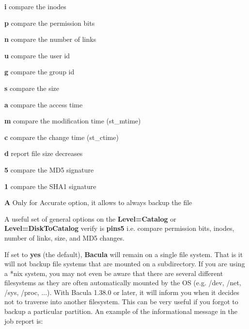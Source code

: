 \begin{description}
      \begin{description}

      \item {\bf i}
      compare the inodes  

      \item {\bf p}
      compare the permission bits  

      \item {\bf n}
      compare the number of links  

      \item {\bf u}
      compare the user id  

      \item {\bf g}
      compare the group id  

      \item {\bf s}
      compare the size  

      \item {\bf a}
      compare the access time  

      \item {\bf m}
      compare the modification time (st\_mtime)  

      \item {\bf c}
      compare the change time (st\_ctime)  

      \item {\bf d}
      report file size decreases  

      \item {\bf 5}
      compare the MD5 signature  

      \item {\bf 1}
      compare the SHA1 signature  

      \item {\bf A}
      Only for Accurate option, it allows to always backup the file

      \end{description}

   A useful set of general options on the {\bf Level=Catalog}  or {\bf
   Level=DiskToCatalog}  verify is {\bf pins5} i.e. compare permission bits,
   inodes, number  of links, size, and MD5 changes. 

\item [onefs=yes\vb{}no]
   If set to {\bf yes} (the default), {\bf Bacula} will remain on a single
   file system.  That is it will not backup file systems that are mounted
   on a subdirectory.  If you are using a *nix system, you may not even be
   aware that there are several different filesystems as they are often
   automatically mounted by the OS (e.g.  /dev, /net, /sys, /proc, ...).
   With Bacula 1.38.0 or later, it will inform you when it decides not to
   traverse into another filesystem.  This can be very useful if you forgot
   to backup a particular partition.  An example of the informational
   message in the job report is:


\end{description}
